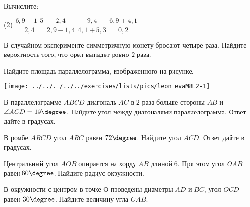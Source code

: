 \begin{homework}[number=1]
	\begin{listofex}
		\item Вычислите:
		\begin{tasks}(2)
			\task \( \dfrac{6,9-1,5}{2,4} \)
			\task \( \dfrac{2,4}{2,9-1,4} \)
			\task \( \dfrac{9,4}{4,1+5,3} \)
			\task \( \dfrac{6,9+4,1}{0,2} \)
		\end{tasks}
		\item В случайном эксперименте симметричную монету бросают четыре раза. Найдите вероятность того, что орел выпадет ровно \( 2 \) раза.
		\item 
		\begin{minipage}[t]{\bodywidth}
			Найдите площадь параллелограмма, изображенного на рисунке.
		\end{minipage}
		\hspace{0.02\linewidth}
		\begin{minipage}[t]{\picwidth}
			\texttt{[image: ../../../../../exercises/lists/pics/leontevaM8L2-1]}
		\end{minipage}
		\item В параллелограмме \( ABCD \) диагональ \( AC \) в \( 2 \) раза больше стороны \( AB \) и \( \angle ACD=19\degree \). Найдите угол между диагоналями параллелограмма. Ответ дайте в градусах.
		\item В ромбе \( ABCD \) угол \( ABC \) равен \( 72\degree \). Найдите угол \( ACD \). Ответ дайте в градусах.
		\item Центральный угол \(  AOB \) опирается на хорду \( AB \) длиной \( 6 \). При этом угол \( OAB \) равен \( 60\degree \). Найдите радиус окружности.
		\item В окружности с центром в точке \( О \) проведены диаметры \( AD \) и \( BC \), угол \( OCD \) равен \( 30\degree \). Найдите величину угла \( OAB \).
	\end{listofex}
\end{homework}

